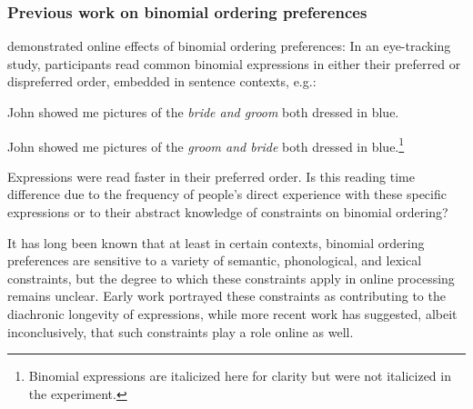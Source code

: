 \documentclass[authoryear]{elsarticle}
\begin{document}
\subsubsection{Previous work on binomial ordering preferences}

\citet{SiyanovaChanturia:2011ep} demonstrated online effects of binomial ordering preferences: In an eye-tracking study, participants read common binomial expressions in either their preferred or dispreferred order, embedded in sentence contexts, e.g.:
\begin{exe}
\item John showed me pictures of the \emph{bride and groom} both dressed in blue.
\item John showed me pictures of the \emph{groom and bride} both dressed in blue.\footnote{Binomial expressions are italicized here for clarity but were not italicized in the experiment.}
\end{exe}
Expressions were read faster in their preferred order. Is this reading time difference due to the frequency of people's direct experience with these specific expressions or to their abstract knowledge of constraints on binomial ordering?

It has long been known that at least in certain contexts, binomial ordering preferences are sensitive to a variety of semantic, phonological, and lexical constraints, but the degree to which these constraints apply in online processing remains unclear. Early work portrayed these constraints as contributing to the diachronic longevity of expressions, while more recent work has suggested, albeit inconclusively, that such constraints play a role online as well.
 	
\end{document}
